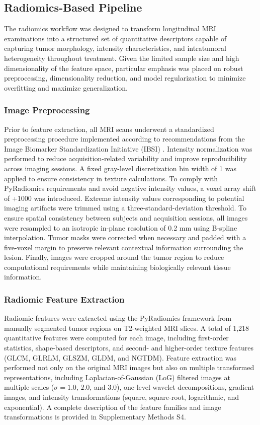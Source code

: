 \documentclass{article}
\begin{document}
\subsection{Radiomics-Based Pipeline}

The radiomics workflow was designed to transform longitudinal MRI examinations into a structured set of quantitative descriptors capable of capturing tumor morphology, intensity characteristics, and intratumoral heterogeneity throughout treatment. Given the limited sample size and high dimensionality of the feature space, particular emphasis was placed on robust preprocessing, dimensionality reduction, and model regularization to minimize overfitting and maximize generalization.

\subsubsection{Image Preprocessing}

Prior to feature extraction, all MRI scans underwent a standardized preprocessing procedure implemented according to recommendations from the Image Biomarker Standardization Initiative (IBSI) \cite{Zwanenburg_2020}. Intensity normalization was performed to reduce acquisition-related variability and improve reproducibility across imaging sessions. A fixed gray-level discretization bin width of 1 was applied to ensure consistency in texture calculations. To comply with PyRadiomics \cite{pyradiomics} requirements and avoid negative intensity values, a voxel array shift of +1000 was introduced. Extreme intensity values corresponding to potential imaging artifacts were trimmed using a three-standard-deviation threshold. To ensure spatial consistency between subjects and acquisition sessions, all images were resampled to an isotropic in-plane resolution of 0.2 mm using B-spline interpolation. Tumor masks were corrected when necessary and padded with a five-voxel margin to preserve relevant contextual information surrounding the lesion. Finally, images were cropped around the tumor region to reduce computational requirements while maintaining biologically relevant tissue information.

\subsubsection{Radiomic Feature Extraction}

Radiomic features were extracted using the PyRadiomics framework from manually segmented tumor regions on T2-weighted MRI slices. A total of 1,218 quantitative features were computed for each image, including first-order statistics, shape-based descriptors, and second- and higher-order texture features (GLCM, GLRLM, GLSZM, GLDM, and NGTDM). Feature extraction was performed not only on the original MRI images but also on multiple transformed representations, including Laplacian-of-Gaussian (LoG) filtered images at multiple scales ($\sigma = 1.0$, $2.0$, and $3.0$), one-level wavelet decompositions, gradient images, and intensity transformations (square, square-root, logarithmic, and exponential). A complete description of the feature families and image transformations is provided in Supplementary Methods S4.
\end{document}
